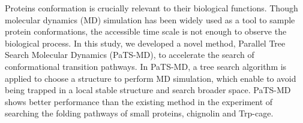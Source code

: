 




Proteins conformation is crucially relevant to their biological functions. Though molecular dynamics (MD) simulation has been widely used as a tool to sample protein conformations, the accessible time scale is not enough to observe the biological process. In this study, we developed a novel method, Parallel Tree Search Molecular Dynamics (PaTS-MD), to accelerate the search of conformational transition pathways. In PaTS-MD, a tree search algorithm is applied to choose a structure to perform MD simulation, which enable to avoid being trapped in a local stable structure and search broader space. PaTS-MD shows better performance than the existing method in the experiment of searching the folding pathways of small proteins, chignolin and Trp-cage.